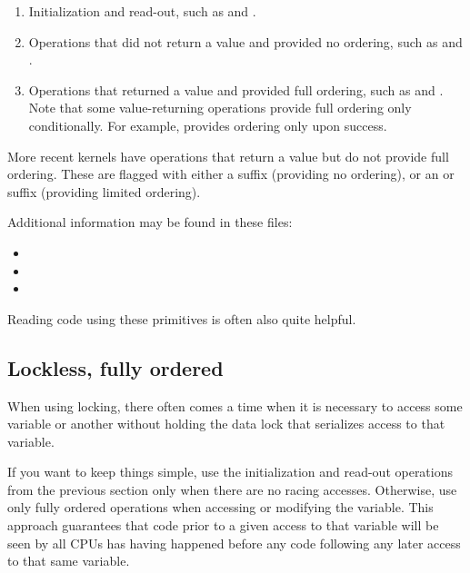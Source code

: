 \begin{enumerate}
  \item Initialization and read-out, such as  and .

  \item Operations that did not return a value and provided no ordering,
	such as  and .

  \item Operations that returned a value and provided full ordering, such as
	 and .
	Note that some value-returning operations provide full ordering
	only conditionally.
	For example,  provides ordering only upon success.
\end{enumerate}

More recent kernels have operations that return a value but do not
provide full ordering.  These are flagged with either a 
suffix (providing no ordering), or an  or  suffix
(providing limited ordering).

Additional information may be found in these files:

\begin{itemize}
  \item {}
  \item {}
  \item {}
\end{itemize}

Reading code using these primitives is often also quite helpful.


\subsection{Lockless, fully ordered}

When using locking, there often comes a time when it is necessary
to access some variable or another without holding the data lock
that serializes access to that variable.

If you want to keep things simple, use the initialization and read-out
operations from the previous section only when there are no racing
accesses.
Otherwise, use only fully ordered operations when accessing or
modifying the variable.
This approach guarantees that code prior to a given access to that
variable will be seen by all CPUs has having happened before any code
following any later access to that same variable.

